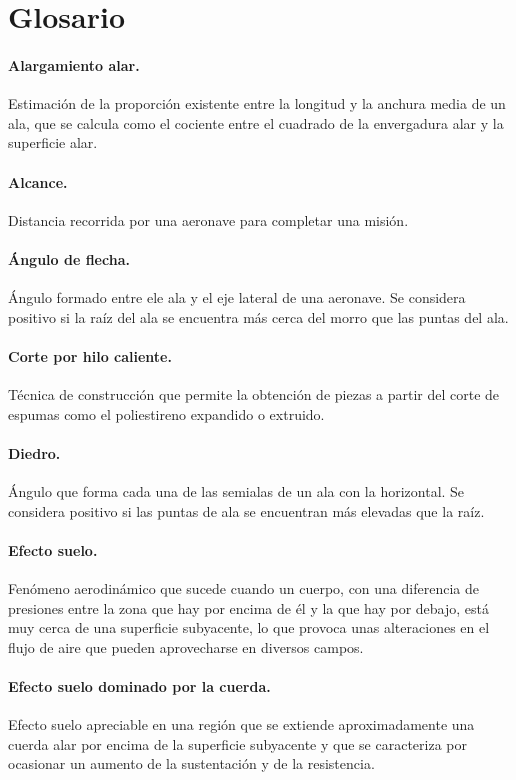 \section*{Glosario}
\label{sec:glosario}

\paragraph{Alargamiento alar.} Estimación de la proporción existente entre la longitud y la anchura media de un ala, que se calcula como el cociente entre el cuadrado de la envergadura alar y la superficie alar.

\paragraph{Alcance.} Distancia recorrida por una aeronave para completar una misión.

\paragraph{Ángulo de flecha.} Ángulo formado entre ele ala y el eje lateral de una aeronave. Se considera positivo si la raíz del ala se encuentra más cerca del morro que las puntas del ala.

\paragraph{Corte por hilo caliente.} Técnica de construcción que permite la obtención de piezas a partir del corte de espumas como el poliestireno expandido o extruido.

\paragraph{Diedro.} Ángulo que forma cada una de las semialas de un ala con la horizontal. Se considera positivo si las puntas de ala se encuentran más elevadas que la raíz.

\paragraph{Efecto suelo.} Fenómeno aerodinámico que sucede cuando un cuerpo, con una diferencia de presiones entre la zona que hay por encima de él y la que hay por debajo, está muy cerca de una superficie subyacente, lo que provoca unas alteraciones en el flujo de aire que pueden aprovecharse en diversos campos.

\paragraph{Efecto suelo dominado por la cuerda.} Efecto suelo apreciable en una región que se extiende aproximadamente una cuerda alar por encima de la superficie subyacente y que se caracteriza por ocasionar un aumento de la sustentación y de la resistencia.

